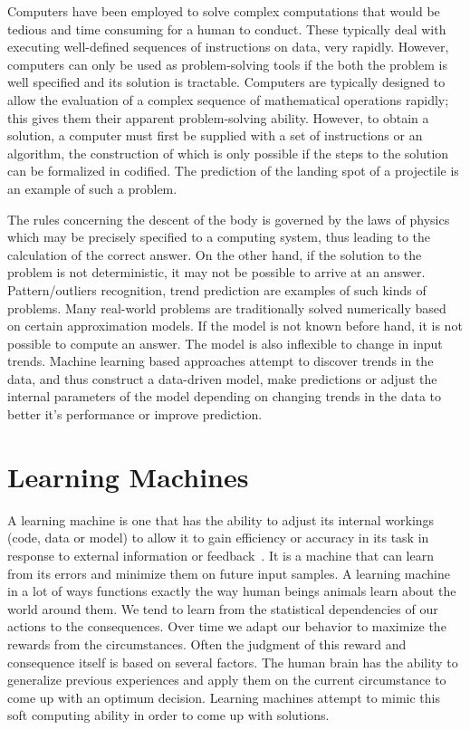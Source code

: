 Computers have been employed to solve complex computations that would be tedious and time consuming for a human to conduct. These typically deal with executing well-defined sequences of instructions on data, very rapidly. However, computers can only be used as problem-solving tools if the both the problem is well specified and its solution is tractable. Computers are typically designed to allow the evaluation of a complex sequence of mathematical operations rapidly; this gives them their apparent problem-solving ability. However, to obtain a solution, a computer must first be supplied with a set of instructions or an algorithm, the construction of which is only possible if the steps to the solution can be formalized in codified. The prediction of the landing spot of a projectile is an example of such a problem. 

The rules concerning the descent of the body is governed by the laws of physics which may be precisely specified to a computing system, thus leading to the calculation of the correct answer. On the other hand, if the solution to the problem is not deterministic, it may not be possible to arrive at an answer. Pattern/outliers recognition, trend prediction are examples of such kinds of problems. Many real-world problems are traditionally solved numerically based on certain approximation models. If the model is not known before hand, it is not possible to compute an answer. The model is also inflexible to change in input trends. Machine learning based approaches attempt to discover trends in the data, and thus construct a data-driven model, make predictions or adjust the internal parameters of the model depending on changing trends in the data to better it's performance or improve prediction.

\section{Learning Machines}
A learning machine is one that has the ability to adjust its internal workings (code, data or model) to allow it to gain efficiency or accuracy in its task in response to external information or feedback~\cite[2]{mohri2012foundations}. It is a machine that can learn from its errors and minimize them on future input samples. A learning machine in a lot of ways functions exactly the way human beings animals learn about the world around them. We tend to learn from the statistical dependencies of our actions to the consequences. Over time we adapt our behavior to maximize the rewards from the circumstances. Often the judgment of this reward and consequence itself is based on several factors. The human brain has the ability to generalize previous experiences and apply them on the current circumstance to come up with an optimum decision. Learning machines attempt to mimic this soft computing ability in order to come up with solutions.

